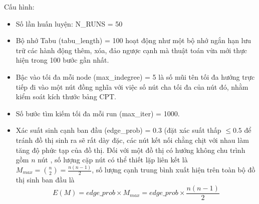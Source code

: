 \noindent
Cấu hình: 
\begin{itemize}
    \item Số lần huấn luyện: N\_RUNS = 50 
    \item Bộ nhớ Tabu (tabu\_length) = 100 hoạt động như một bộ nhớ ngắn hạn lưu trữ các hành động thêm, xóa, đảo ngược cạnh mà thuật toán vừa mới thực hiện trong 100 bước gần nhất. 
    \item Bậc vào tối đa mỗi node (max\_indegree) = 5 là số mũi tên tối đa hướng trực tiếp đi vào một nút đồng nghĩa với việc số nút cha tối đa của nút đó, nhằm kiểm soát kích thước bảng CPT.
    \item Số bước tìm kiếm tối đa mỗi run (max\_iter) = 1000.
    \item Xác suất sinh cạnh ban đầu (edge\_prob) = 0.3 (đặt xác suất thấp $\leq 0.5$ để tránh đồ thị sinh ra sẽ rất dày đặc, các nút kết nối chằng chịt với nhau làm tăng độ phức tạp của đồ thị. Đối với một đồ thị có hướng không chu trình gồm $n$ nút , số lượng cặp nút có thể thiết lặp liên kết là $M_{max} = \binom{n}{2} = \frac{n(n-1)}{2}$, số lượng cạnh trung bình xuất hiện trên toàn bộ đồ thị sinh ban đầu là 
    \begin{equation}
        E(M) = edge\_prob \times M_{max} = edge\_prob \times \frac{n(n-1)}{2}
    \end{equation}    
    
\end{itemize}


